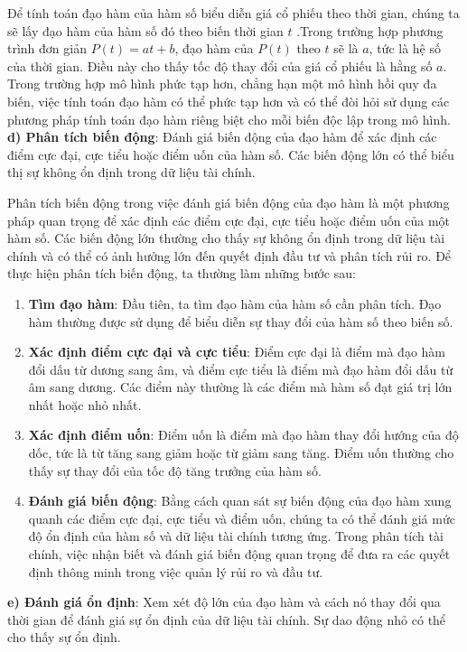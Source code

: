 \documentclass[12pt,a4paper]{report}
\begin{document}
Để tính toán đạo hàm của hàm số biểu diễn giá cổ phiếu theo thời gian, chúng ta sẽ lấy đạo hàm của hàm số đó theo biến thời gian $t$ .Trong trường hợp phương trình đơn giản $P(t)= at + b$, đạo hàm của $P(t)$ theo $t$ sẽ là $a$, tức là hệ số của thời gian. Điều này cho thấy tốc độ thay đổi của giá cổ phiếu là hằng số $a$. Trong trường hợp mô hình phức tạp hơn, chẳng hạn một mô hình hồi quy đa biến, việc tính toán đạo hàm có thể phức tạp hơn và có thể đòi hỏi sử dụng các phương pháp tính toán đạo hàm riêng biệt cho mỗi biến độc lập trong mô hình.\\
\textbf{d) Phân tích biến động}: Đánh giá biến động của đạo hàm để xác định các điểm cực đại, cực tiểu hoặc điểm uốn của hàm số. Các biến động lớn có thể biểu thị sự không ổn định trong dữ liệu tài chính.

Phân tích biến động trong việc đánh giá biến động của đạo hàm là một phương pháp quan trọng để xác định các điểm cực đại, cực tiểu hoặc điểm uốn của một hàm số. Các biến động lớn thường cho thấy sự không ổn định trong dữ liệu tài chính và có thể có ảnh hưởng lớn đến quyết định đầu tư và phân tích rủi ro. Để thực hiện phân tích biến động, ta thường làm những bước sau:
\begin{enumerate}
    \item \textbf{Tìm đạo hàm}: Đầu tiên, ta tìm đạo hàm của hàm số cần phân tích. Đạo hàm thường được sử dụng để biểu diễn sự thay đổi của hàm số theo biến số.
    \item \textbf{Xác định điểm cực đại và cực tiểu}: Điểm cực đại là điểm mà đạo hàm đổi dấu từ dương sang âm, và điểm cực tiểu là điểm mà đạo hàm đổi dấu từ âm sang dương. Các điểm này thường là các điểm mà hàm số đạt giá trị lớn nhất hoặc nhỏ nhất.
    \item \textbf{Xác định điểm uốn}: Điểm uốn là điểm mà đạo hàm thay đổi hướng của độ dốc, tức là từ tăng sang giảm hoặc từ giảm sang tăng. Điểm uốn thường cho thấy sự thay đổi của tốc độ tăng trưởng của hàm số.
    \item \textbf{Đánh giá biến động}: Bằng cách quan sát sự biến động của đạo hàm xung quanh các điểm cực đại, cực tiểu và điểm uốn, chúng ta có thể đánh giá mức độ ổn định của hàm số và dữ liệu tài chính tương ứng. Trong phân tích tài chính, việc nhận biết và đánh giá biến động quan trọng để đưa ra các quyết định thông minh trong việc quản lý rủi ro và đầu tư.
\end{enumerate}
\textbf{e) Đánh giá ổn định}: Xem xét độ lớn của đạo hàm và cách nó thay đổi qua thời gian để đánh giá sự ổn định của dữ liệu tài chính. Sự dao động nhỏ có thể cho thấy sự ổn định.\\
\end{document}
